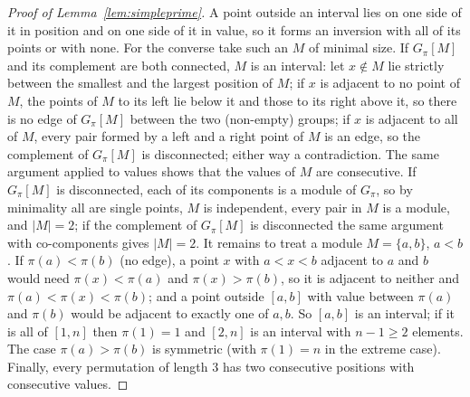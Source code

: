 \documentclass[11pt,a4paper]{article}
\theoremstyle{plain}
\theoremstyle{definition}
\theoremstyle{remark}
\begin{document}
\begin{proof}[Proof of Lemma~\ref{lem:simpleprime}]
A point outside an interval lies on one side of it in position and on one side of it in value, so it forms an inversion with all of its points or with none. For the converse take such an $M$ of minimal size. If $G_\pi[M]$ and its complement are both connected, $M$ is an interval: let $x\notin M$ lie strictly between the smallest and the largest position of $M$; if $x$ is adjacent to no point of $M$, the points of $M$ to its left lie below it and those to its right above it, so there is no edge of $G_\pi[M]$ between the two (non-empty) groups; if $x$ is adjacent to all of $M$, every pair formed by a left and a right point of $M$ is an edge, so the complement of $G_\pi[M]$ is disconnected; either way a contradiction. The same argument applied to values shows that the values of $M$ are consecutive. If $G_\pi[M]$ is disconnected, each of its components is a module of $G_\pi$, so by minimality all are single points, $M$ is independent, every pair in $M$ is a module, and $|M|=2$; if the complement of $G_\pi[M]$ is disconnected the same argument with co-components gives $|M|=2$. It remains to treat a module $M=\{a,b\}$, $a<b$. If $\pi(a)<\pi(b)$ (no edge), a point $x$ with $a<x<b$ adjacent to $a$ and $b$ would need $\pi(x)<\pi(a)$ and $\pi(x)>\pi(b)$, so it is adjacent to neither and $\pi(a)<\pi(x)<\pi(b)$; and a point outside $[a,b]$ with value between $\pi(a)$ and $\pi(b)$ would be adjacent to exactly one of $a,b$. So $[a,b]$ is an interval; if it is all of $[1,n]$ then $\pi(1)=1$ and $[2,n]$ is an interval with $n-1\ge2$ elements. The case $\pi(a)>\pi(b)$ is symmetric (with $\pi(1)=n$ in the extreme case). Finally, every permutation of length $3$ has two consecutive positions with consecutive values.
\end{proof}
\end{document}
